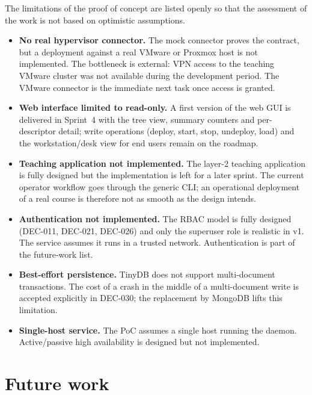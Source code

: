 The limitations of the proof of concept are listed openly so that
the assessment of the work is not based on optimistic assumptions.

\begin{itemize}
  \item \textbf{No real hypervisor connector.} The mock connector
        proves the contract, but a deployment against a real VMware
        or Proxmox host is not implemented. The bottleneck is
        external: VPN access to the teaching VMware cluster was
        not available during the development period. The VMware
        connector is the immediate next task once access is
        granted.
  \item \textbf{Web interface limited to read-only.} A first
        version of the web GUI is delivered in Sprint~4 with the
        tree view, summary counters and per-descriptor detail; write
        operations (deploy, start, stop, undeploy, load) and the
        workstation/desk view for end users remain on the roadmap.
  \item \textbf{Teaching application not implemented.} The
        layer-2 teaching application is fully designed but the
        implementation is left for a later sprint. The current
        operator workflow goes through the generic CLI; an
        operational deployment of a real course is therefore not
        as smooth as the design intends.
  \item \textbf{Authentication not implemented.} The RBAC model is
        fully designed (DEC-011, DEC-021, DEC-026) and only the
        superuser role is realistic in v1. The service assumes it
        runs in a trusted network. Authentication is part of the
        future-work list.
  \item \textbf{Best-effort persistence.} TinyDB does not support
        multi-document transactions. The cost of a crash in the
        middle of a multi-document write is accepted explicitly in
        DEC-030; the replacement by MongoDB lifts this limitation.
  \item \textbf{Single-host service.} The PoC assumes a single
        host running the daemon. Active/passive high availability
        is designed but not implemented.
\end{itemize}

\section{Future work}
\label{sec:futuro}

